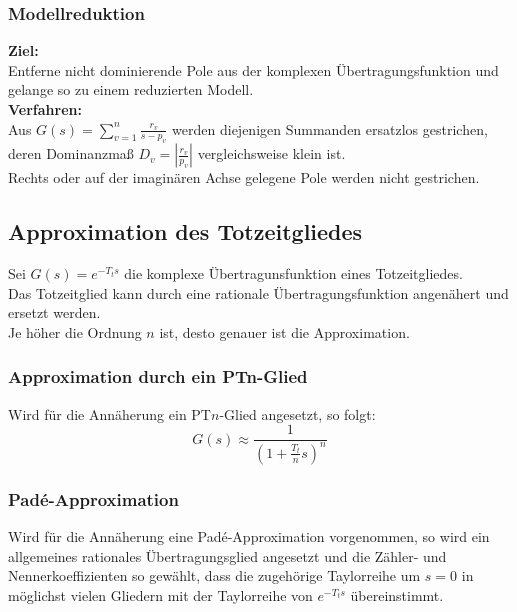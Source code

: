 \documentclass[10pt,a4paper]{article}
\begin{document}
\subsubsection{Modellreduktion}
\textbf{Ziel:} \\
Entferne nicht dominierende Pole aus der komplexen Übertragungsfunktion und gelange so zu einem reduzierten Modell. \\

\textbf{Verfahren:} \\
Aus $G(s) = \sum_{v = 1}^n \frac{r_v}{s - p_v}$ werden diejenigen Summanden ersatzlos gestrichen, deren Dominanzmaß $D_v = |\frac{r_v}{p_v}|$ vergleichsweise klein ist. \\
Rechts oder auf der imaginären Achse gelegene Pole werden nicht gestrichen.

\subsection{Approximation des Totzeitgliedes}
Sei $G(s) = e^{-T_t s}$ die komplexe Übertragunsfunktion eines Totzeitgliedes. \\
Das Totzeitglied kann durch eine rationale Übertragungsfunktion angenähert und ersetzt werden. \\
Je höher die Ordnung $n$ ist, desto genauer ist die Approximation.

\subsubsection{Approximation durch ein PTn-Glied}
Wird für die Annäherung ein PT$n$-Glied angesetzt, so folgt:
$$
	G(s) \approx \frac{1}{(1 + \frac{T_t}{n}s)^n}
$$

\subsubsection{Padé-Approximation}
Wird für die Annäherung eine Padé-Approximation vorgenommen, so wird ein allgemeines rationales Übertragungsglied angesetzt und die Zähler- und Nennerkoeffizienten so gewählt, dass die zugehörige Taylorreihe um $s = 0$ in möglichst vielen Gliedern mit der Taylorreihe von $e^{-T_t s}$ übereinstimmt. \\
\end{document}
